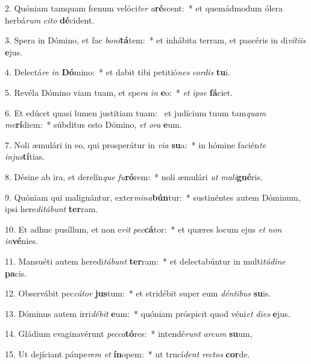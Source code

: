 2. Quóniam tamquam fœnum velóci\textit{ter} \textit{a}\textbf{ré}scent:~*  et quemádmodum ólera herbá\textit{rum} \textit{ci}\textit{to} \textbf{dé}cident.\

3. Spera in Dómino, et fac \textit{bo}\textit{ni}\textbf{tá}tem:~*  et inhábita terram, et pascéris in di\textit{ví}\textit{ti}\textit{is} \textbf{e}jus.\

4. Delectá\textit{re} \textit{in} \textbf{Dó}mino:~*  et dabit tibi petitió\textit{nes} \textit{cor}\textit{dis} \textbf{tu}i.\

5. Revéla Dómino viam tuam, et spe\textit{ra} \textit{in} \textbf{e}o:~*  \textit{et} \textit{ip}\textit{se} \textbf{fá}ciet.\

6. Et edúcet quasi lumen justítiam tuam: \dag\  et judícium tuum tam\textit{quam} \textit{me}\textbf{rí}diem:~*  súbditus esto Dómino, \textit{et} \textit{o}\textit{ra} \textbf{e}um.\

7. Noli æmulári in eo, qui prosperátur in \textit{vi}\textit{a} \textbf{su}a:~*  in hómine facién\textit{te} \textit{in}\textit{jus}\textbf{tí}tias.\

8. Désine ab ira, et derelín\textit{que} \textit{fu}\textbf{ró}rem:~*  noli æmulári \textit{ut} \textit{ma}\textit{li}\textbf{gné}ris.\

9. Quóniam qui malignántur, exter\textit{mi}\textit{na}\textbf{bún}tur:~*  sustinéntes autem Dóminum, ipsi here\textit{di}\textit{tá}\textit{bunt} \textbf{ter}ram.\

10. Et adhuc pusíllum, et non e\textit{rit} \textit{pec}\textbf{cá}tor:~*  et quæres locum ejus \textit{et} \textit{non} \textit{in}\textbf{vé}nies.\

11. Mansuéti autem heredi\textit{tá}\textit{bunt} \textbf{ter}ram:~*  et delectabúntur in multi\textit{tú}\textit{di}\textit{ne} \textbf{pa}cis.\

12. Observábit pec\textit{cá}\textit{tor} \textbf{jus}tum:~*  et stridébit super eum \textit{dén}\textit{ti}\textit{bus} \textbf{su}is.\

13. Dóminus autem irri\textit{dé}\textit{bit} \textbf{e}um:~*  quóniam próspicit quod véni\textit{et} \textit{di}\textit{es} \textbf{e}jus.\

14. Gládium evaginavérunt \textit{pec}\textit{ca}\textbf{tó}res:~*  intendé\textit{runt} \textit{ar}\textit{cum} \textbf{su}um,\

15. Ut dejíciant páupe\textit{rem} \textit{et} \textbf{ín}opem:~*  ut trucí\textit{dent} \textit{rec}\textit{tos} \textbf{cor}de.\

